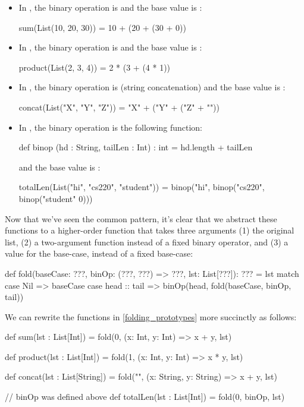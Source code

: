 \documentclass{book}
\begin{document}
\begin{itemize}

\item In , the binary operation is \scalainline{+}
and the base value is :
\begin{scalacode}
sum(List(10, 20, 30)) = 10 + (20 + (30 + 0))
\end{scalacode}

\item In , the binary operation is \scalainline{*}
and the base value is :
\begin{scalacode}
product(List(2, 3, 4)) = 2 * (3 + (4 * 1))
\end{scalacode}

\item In , the binary operation is \scalainline{+} (string
concatenation) and the base value is :
\begin{scalacode}
concat(List("X", "Y", "Z")) = "X" + ("Y" + ("Z" + ""))
\end{scalacode}

\item In , the binary operation is the following
function:
\begin{scalacode}
def binop (hd : String, tailLen : Int) : int = hd.length + tailLen
\end{scalacode}
and the base value is :
\begin{scalacode}
totalLen(List("hi", "cs220", "student")) = binop("hi", binop("cs220", binop("student" 0)))
\end{scalacode}

\end{itemize}

Now that we've seen the common pattern, it's clear that we abstract
these functions to a higher-order
function that takes three arguments (1) the original list, (2)
a two-argument function instead of a fixed binary operator, and (3) a
value for the base-case, instead of a fixed base-case:
%
\begin{scalacode}
def fold(baseCase: ???, binOp: (???, ???) => ???, lst: List[???]): ??? = lst match {
  case Nil => baseCase
  case head :: tail => binOp(head, fold(baseCase, binOp, tail))
}
\end{scalacode}

We can rewrite the functions in \cref{folding_prototypes} more
succinctly as follows:
%
\begin{scalacode}
def sum(lst : List[Int]) = fold(0, (x: Int, y: Int) => x + y, lst)

def product(lst : List[Int]) = fold(1, (x: Int, y: Int) => x * y, lst)

def concat(lst : List[String]) = fold("", (x: String, y: String) => x + y, lst)

// binOp was defined above
def totalLen(lst : List[Int]) = fold(0, binOp, lst)
\end{scalacode}
\end{document}
